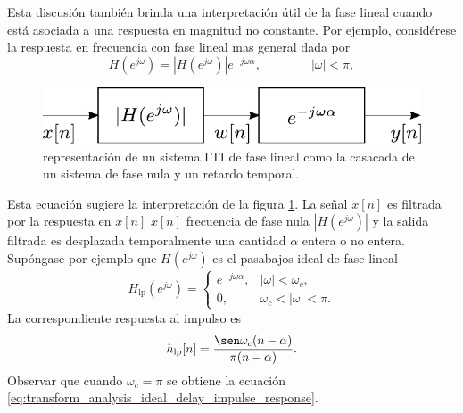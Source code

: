 \documentclass[a4paper]{report}
\begin{document}
Esta discusión también brinda una interpretación útil de la fase lineal cuando está asociada a una respuesta en magnitud no constante. Por ejemplo, considérese la respuesta en frecuencia con fase lineal mas general dada por
\[
 H(e^{j\omega})=|H(e^{j\omega})|e^{-j\omega\alpha},
  \qquad\qquad 
 |\omega|<\pi,
\]
\begin{figure}[!htb]
 \begin{minipage}[c]{0.42\textwidth}
  \includegraphics[width=\textwidth]{figuras/linear_phase_lti_system_cascade.pdf}
 \end{minipage}\hfill
 \begin{minipage}[c]{0.48\textwidth}
 \caption{representación de un sistema LTI de fase lineal como la casacada de un sistema de fase nula y un retardo temporal.
 }\label{fig:linear_phase_lti_system_cascade}
 \end{minipage}
\end{figure}
Esta ecuación sugiere la interpretación de la figura \ref{fig:linear_phase_lti_system_cascade}. La señal \(x[n]\) es filtrada por la respuesta en \(x[n]\) \(x[n]\) frecuencia de fase nula \(|H(e^{j\omega})|\) y la salida filtrada es desplazada temporalmente una cantidad \(\alpha\) entera o no entera. 
Supóngase por ejemplo que \(H(e^{j\omega})\) es el pasabajos ideal de fase lineal
\[
 H_\textrm{lp}(e^{j\omega})=
 \left\{
 \begin{array}{ll}
  e^{-j\omega\alpha}, &|\omega|<\omega_c,\\
  0,                  &\omega_c<|\omega|<\pi.
 \end{array}
 \right.
\]
La correspondiente respuesta al impulso es
\begin{equation}\label{eq:transform_analysis_ideal_lowpass_impulse_response}
 h_\textrm{lp}[n]=\frac{\sen\omega_c(n-\alpha)}{\pi(n-\alpha)}. 
\end{equation}
Observar que cuando \(\omega_c=\pi\) se obtiene la ecuación \ref{eq:transform_analysis_ideal_delay_impulse_response}.
\end{document}
